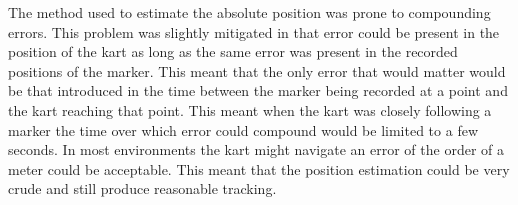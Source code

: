 The method used to estimate the absolute position was prone to compounding errors. This problem was slightly mitigated in that error could be present in the position of the kart as long as the same error was present in the recorded positions of the marker. This meant that the only error that would matter would be that introduced in the time between the marker being recorded at a point and the kart reaching that point. This meant when the kart was closely following a marker the time over which error could compound would be limited to a few seconds. In most environments the kart might navigate an error of the order of a meter could be acceptable. This meant that the position estimation could be very crude and still produce reasonable tracking.